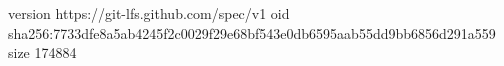 version https://git-lfs.github.com/spec/v1
oid sha256:7733dfe8a5ab4245f2c0029f29e68bf543e0db6595aab55dd9bb6856d291a559
size 174884
